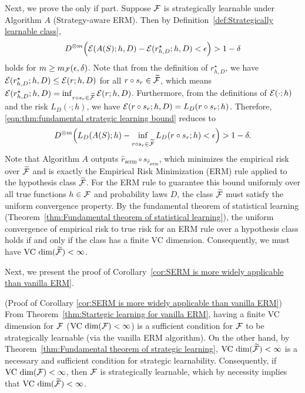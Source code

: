 \begin{apdxproof}
\noindent Next, we prove the only if part. 
Suppose $\mathcal{F}$ is strategically learnable under Algorithm $A$ (Strategy-aware ERM). Then by Definition~\ref{def:Strategically learnable class}, 
\begin{equation}\label{eqn:thm:fundamental strategic learning bound}
    D^{\otimes m}\Big( \mathcal{E}(A(S); h, D) - \mathcal{E}(r^\star_{h, D}; h, D) < \epsilon \Big) > 1 - \delta
\end{equation}
holds for $m \geq m_{\mathcal{F}}(\epsilon,\delta)$.
Note that from the definition of $r^\star_{h,D}$, we have $\mathcal{E}(r^\star_{h,D};h,D) \leq \mathcal{E}(r;h,D)$ for all $r \circ s_r \in \widetilde{\mathcal{F}}$, which means $\mathcal{E}(r^\star_{h, D}; h, D) = \inf_{r \circ s_r \in \widetilde{\mathcal{F}}} \mathcal{E}(r; h, D)$. Furthermore, from the definitions of $\mathcal{E}(\cdot;h)$ and the risk $L_D(\cdot;h)$, we have $\mathcal{E}(r \circ s_r; h, D) = L_D(r \circ s_r; h)$.
Therefore, \eqref{eqn:thm:fundamental strategic learning bound} reduces to 
\begin{equation}\label{eqn:them:fundamanetal strategic learning bound}
    D^{\otimes m}\Big( L_D(A(S);h) - \inf_{r \circ s_r \in \widetilde{\mathcal{F}}} L_D(r \circ s_r;h) < \epsilon \Big) > 1 - \delta.
\end{equation}
Note that Algorithm $A$ outputs $\hat{r}_{\text{serm}} \circ s_{\hat{r}_{\text{serm}}}$, which minimizes the empirical risk over $\widetilde{\mathcal{F}}$ and is exactly the Empirical Risk Minimization (ERM) rule applied to the hypothesis class $\widetilde{\mathcal{F}}$. For the ERM rule to guarantee this bound uniformly over all true functions $h \in \mathcal{F}$ and probability laws $D$, the class $\widetilde{\mathcal{F}}$ must satisfy the uniform convergence property. By the fundamental theorem of statistical learning (Theorem~\ref{thm:Fundamental theorem of statistical learning}), the uniform convergence of empirical risk to true risk for an ERM rule over a hypothesis class holds if and only if the class has a finite VC dimension. Consequently, we must have $\text{VC dim}(\widetilde{\mathcal{F}}) < \infty$.
\end{apdxproof}

Next, we present the proof of Corollary~\ref{cor:SERM is more widely applicable than vanilla ERM}.

\begin{apdxproof}(Proof of Corollary \ref{cor:SERM is more widely applicable than vanilla ERM})\label{proof:SERM is more widely applicable than vanilla ERM}
From Theorem~\ref{thm:Startegic learning for vanilla ERM}, having a finite VC dimension for $\mathcal{F}$ ($\text{VC dim}(\mathcal{F}) < \infty$) is a sufficient condition for $\mathcal{F}$ to be strategically learnable (via the vanilla ERM algorithm). On the other hand, by Theorem~\ref{thm:Fundamental theorem of strategic learning}, $\text{VC dim}(\widetilde{\mathcal{F}}) < \infty$ is a necessary and sufficient condition for strategic learnability. Consequently, if $\text{VC dim}(\mathcal{F}) < \infty$, then $\mathcal{F}$ is strategically learnable, which by necessity implies that $\text{VC dim}(\widetilde{\mathcal{F}}) < \infty$.
\end{apdxproof}

